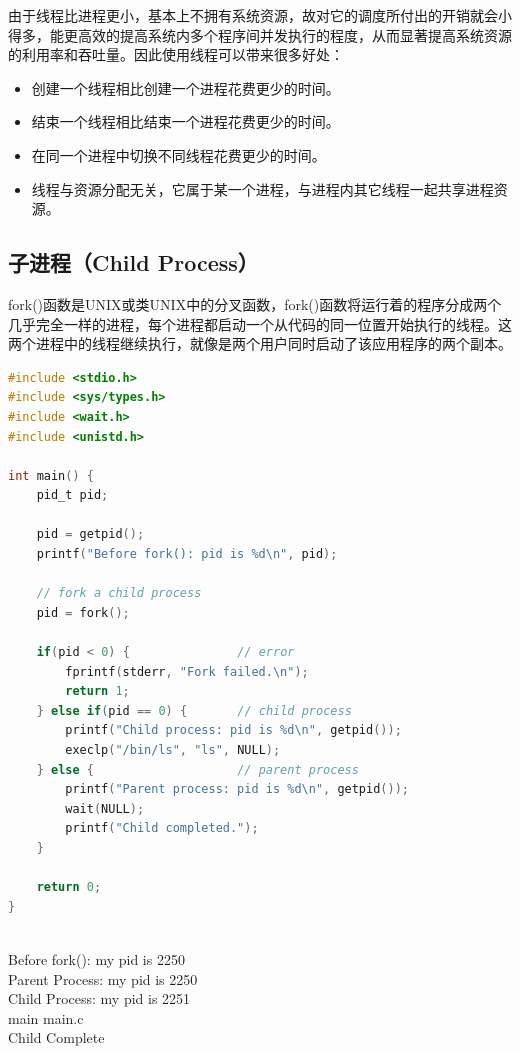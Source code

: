 由于线程比进程更小，基本上不拥有系统资源，故对它的调度所付出的开销就会小得多，能更高效的提高系统内多个程序间并发执行的程度，从而显著提高系统资源的利用率和吞吐量。因此使用线程可以带来很多好处：

\begin{itemize}
	\item 创建一个线程相比创建一个进程花费更少的时间。
	\item 结束一个线程相比结束一个进程花费更少的时间。
	\item 在同一个进程中切换不同线程花费更少的时间。
	\item 线程与资源分配无关，它属于某一个进程，与进程内其它线程一起共享进程资源。
\end{itemize}

\subsection{子进程（Child Process）}

fork()函数是UNIX或类UNIX中的分叉函数，fork()函数将运行着的程序分成两个几乎完全一样的进程，每个进程都启动一个从代码的同一位置开始执行的线程。这两个进程中的线程继续执行，就像是两个用户同时启动了该应用程序的两个副本。 \\

\begin{lstlisting}[language=C]
#include <stdio.h>
#include <sys/types.h>
#include <wait.h>
#include <unistd.h>

int main() {
	pid_t pid;

	pid = getpid();
	printf("Before fork(): pid is %d\n", pid);

	// fork a child process
	pid = fork();

	if(pid < 0) {               // error
		fprintf(stderr, "Fork failed.\n");
		return 1;
	} else if(pid == 0) {       // child process
		printf("Child process: pid is %d\n", getpid());
		execlp("/bin/ls", "ls", NULL);
	} else {                    // parent process
		printf("Parent process: pid is %d\n", getpid());
		wait(NULL);
		printf("Child completed.");
	}
	
	return 0;
}
\end{lstlisting}

\begin{tcolorbox}
	 \\
	Before fork(): my pid is 2250 \\
	Parent Process: my pid is 2250 \\
	Child Process: my pid is 2251 \\
	main main.c \\
	Child Complete
\end{tcolorbox}


